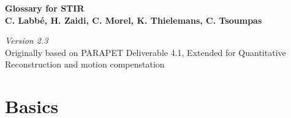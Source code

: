 \documentclass{article}
\begin{document}
\begin{center}
\textbf{{\huge Glossary for STIR}}\\
\textbf{C. Labb\'{e}, H. Zaidi, C. Morel, K. Thielemans, C. Tsoumpas}
\end{center}

\begin{center}
\textit{Version 2.3}\\
Originally based on PARAPET Deliverable 4.1,
Extended for Quantitative Reconstruction and motion compenstation

\end{center}

\section*{Basics}
\end{document}

